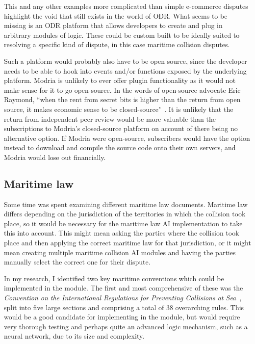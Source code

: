 This and any other examples more complicated than simple e-commerce disputes highlight the void that still exists in the world of ODR. What seems to be missing is an ODR platform that allows developers to create and plug in arbitrary modules of logic. These could be custom built to be ideally suited to resolving a specific kind of dispute, in this case maritime collision disputes.

Such a platform would probably also have to be open source, since the developer needs to be able to hook into events and/or functions exposed by the underlying platform. Modria is unlikely to ever offer plugin functionality as it would not make sense for it to go open-source. In the words of open-source advocate Eric Raymond, ``when the rent from secret bits is higher than the return from open source, it makes economic sense to be closed-source"~\cite{eric:catB}. It is unlikely that the return from independent peer-review would be more valuable than the subscriptions to Modria's closed-source platform on account of there being no alternative option. If Modria were open-source, subscribers would have the option instead to download and compile the source code onto their own servers, and Modria would lose out financially.

\subsection{Maritime law}

Some time was spent examining different maritime law documents. Maritime law differs depending on the jurisdiction of the territories in which the collision took place, so it would be necessary for the maritime law AI implementation to take this into account. This might mean asking the parties where the collision took place and then applying the correct maritime law for that jurisdiction, or it might mean creating multiple maritime collision AI modules and having the parties manually select the correct one for their dispute.

In my research, I identified two key maritime conventions which could be implemented in the module. The first and most comprehensive of these was the \emph{Convention on the International Regulations for Preventing Collisions at Sea}~\cite{law:long}, split into five large sections and comprising a total of 38 overarching rules. This would be a good candidate for implementing in the module, but would require very thorough testing and perhaps quite an advanced logic mechanism, such as a neural network, due to its size and complexity.

